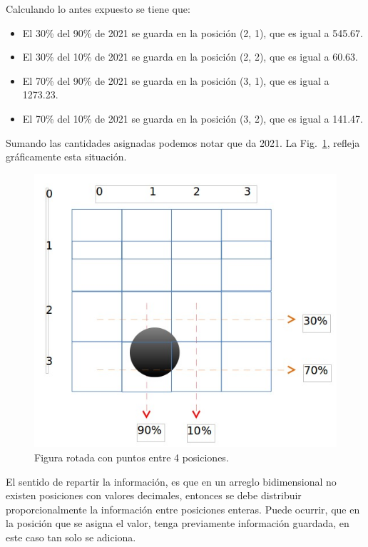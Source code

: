 Calculando lo antes expuesto se tiene que:

\begin{itemize}
  \item El 30\% del 90\% de 2021 se guarda en la posición (2, 1), que es igual
    a 545.67.
  \item El 30\% del 10\% de 2021 se guarda en la posición (2, 2), que es igual
    a 60.63.
  \item El 70\% del 90\% de 2021 se guarda en la posición (3, 1), que es igual
    a 1273.23.
  \item El 70\% del 10\% de 2021 se guarda en la posición (3, 2), que es igual
    a 141.47.
\end{itemize}

Sumando las cantidades asignadas podemos notar que da 2021. La
Fig.~\ref{img:punto4pos}, refleja gráficamente esta situación.

\begin{figure}[ht!]
  \begin{center}
    \includegraphics[scale=.5]{image/p4p}
  \end{center}
  \caption{Figura rotada con puntos entre 4
  posiciones.}\label{img:punto4pos}
\end{figure}

El sentido de repartir la información, es que en un arreglo
bidimensional no existen posiciones con valores decimales, entonces se
debe distribuir proporcionalmente la información entre posiciones
enteras. Puede ocurrir, que en la posición que se asigna el valor,
tenga previamente información guardada, en este caso tan solo se
adiciona.

